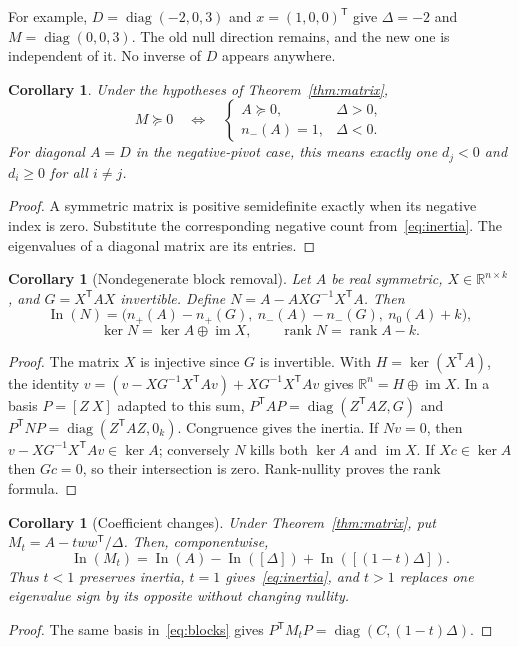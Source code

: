 \documentclass[11pt]{article}
\newtheorem{corollary}[theorem]{Corollary}
\newcommand{\R}{\mathbb R}
\newcommand{\In}{\operatorname{In}}
\newcommand{\diag}{\operatorname{diag}}
\newcommand{\rank}{\operatorname{rank}}
\begin{document}
For example, $D=\diag(-2,0,3)$ and $x=(1,0,0)^{\mathsf T}$ give
$\Delta=-2$ and $M=\diag(0,0,3)$. The old null direction remains, and the
new one is independent of it. No inverse of $D$ appears anywhere.

\begin{corollary}\label{cor:psd}
Under the hypotheses of Theorem~\ref{thm:matrix},
\[
M\succeq0\quad\Longleftrightarrow\quad
\begin{cases}
A\succeq0,&\Delta>0,\\
n_-(A)=1,&\Delta<0.
\end{cases}
\]
For diagonal $A=D$ in the negative-pivot case, this means exactly one $d_j<0$
and $d_i\ge0$ for all $i\ne j$.
\end{corollary}
\begin{proof}
A symmetric matrix is positive semidefinite exactly when its negative
index is zero. Substitute the corresponding negative count
from~\eqref{eq:inertia}. The eigenvalues of a diagonal matrix are its entries.
\end{proof}

\begin{corollary}[Nondegenerate block removal]\label{cor:block}
Let $A$ be real symmetric, $X\in\R^{n\times k}$, and
$G=X^{\mathsf T}AX$ invertible. Define
$N=A-AXG^{-1}X^{\mathsf T}A$. Then
\[
\In(N)=\bigl(n_+(A)-n_+(G),\ n_-(A)-n_-(G),\ n_0(A)+k\bigr),
\]
\[
\ker N=\ker A\oplus\operatorname{im}X,\qquad
\rank N=\rank A-k.
\]
\end{corollary}
\begin{proof}
The matrix $X$ is injective since $G$ is invertible. With
$H=\ker(X^{\mathsf T}A)$, the identity
$v=(v-XG^{-1}X^{\mathsf T}Av)+XG^{-1}X^{\mathsf T}Av$
gives $\R^n=H\oplus\operatorname{im}X$.
In a basis $P=[Z\ X]$ adapted to this sum,
$P^{\mathsf T}AP=\diag(Z^{\mathsf T}AZ,G)$ and
$P^{\mathsf T}NP=\diag(Z^{\mathsf T}AZ,0_k)$.
Congruence gives the inertia. If $Nv=0$, then
$v-XG^{-1}X^{\mathsf T}Av\in\ker A$; conversely $N$ kills both
$\ker A$ and $\operatorname{im}X$. If $Xc\in\ker A$ then $Gc=0$,
so their intersection is zero. Rank-nullity proves the rank formula.
\end{proof}

\begin{corollary}[Coefficient changes]\label{cor:coefficient}
Under Theorem~\ref{thm:matrix}, put $M_t=A-tww^{\mathsf T}/\Delta$.
Then, componentwise,
\[
\In(M_t)=\In(A)-\In([\Delta])+\In([(1-t)\Delta]).
\]
Thus $t<1$ preserves inertia, $t=1$ gives~\eqref{eq:inertia},
and $t>1$ replaces one eigenvalue sign by its opposite without changing nullity.
\end{corollary}
\begin{proof}
The same basis in~\eqref{eq:blocks} gives
$P^{\mathsf T}M_tP=\diag(C,(1-t)\Delta)$.
\end{proof}
\end{document}

